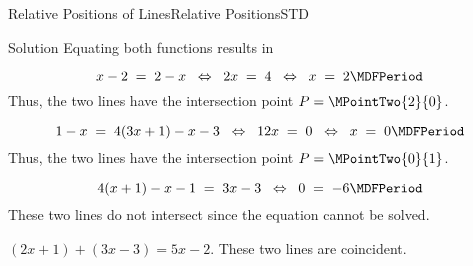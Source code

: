 \begin{MXContent}{Relative Positions of Lines}{Relative Positions}{STD}
\begin{MExercise}

\begin{MHint}{Solution}
Equating both functions results in
\begin{MExerciseItems}
\item{
$$
x-2 \;=\; 2-x \;\; \Leftrightarrow\;\; 2x\;=\; 4 \;\; \Leftrightarrow\;\; x \;=\; 2 \MDFPeriod
$$
Thus, the two lines have the intersection point $P=\MPointTwo{2}{0}$.}
\item{
$$
1-x \;=\; 4(3x+1)-x-3 \;\; \Leftrightarrow\;\; 12x\;=\; 0 \;\; \Leftrightarrow\;\; x \;=\; 0\MDFPeriod
$$
Thus, the two lines have the intersection point $P=\MPointTwo{0}{1}$.}
\item{ 
$$
4(x+1)-x-1 \;=\; 3x-3\;\; \Leftrightarrow\;\; 0\;=\; -6 \MDFPeriod
$$
These two lines do not intersect since the equation cannot be solved.}
\item{$(2x+1)+(3x-3)=5x-2$. These two lines are coincident.}
\end{MExerciseItems}
\end{MHint}


\end{MExercise}
\end{MXContent}
